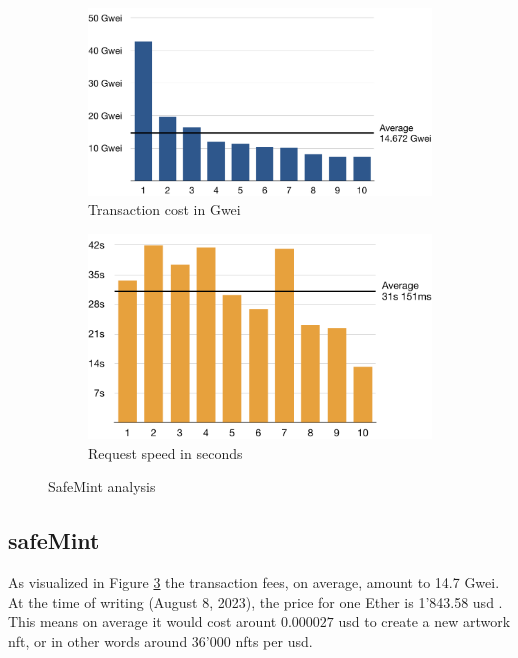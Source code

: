 \begin{figure}[h!]
    \begin{subfigure}{0.5\textwidth}
        \includegraphics[width=\textwidth]{diagrams/safeMint_tx_cost.pdf}
        \caption{Transaction cost in Gwei}
        \label{fig:safemint_tx_cost}
    \end{subfigure}
    \hfill
    \begin{subfigure}{0.5\textwidth}
        \includegraphics[width=\textwidth]{diagrams/safeMint_tx_speed.pdf}
        \caption{Request speed in seconds}
        \label{fig:safemint_tx_speed}
    \end{subfigure}
    \caption{SafeMint analysis}
    \label{fig:safemint_analysis}
\end{figure}

\subsection*{safeMint}
As visualized in Figure \ref{fig:safemint_analysis} the transaction fees, on average, amount to 14.7 Gwei. At the time of writing (August 8, 2023), the price for one Ether is 1'843.58 \gls{usd} \cite{coinmarketcap}. This means on average it would cost arount $0.000027$ \gls{usd} to create a new artwork \gls{nft}, or in other words around 36'000 \glspl{nft} per \gls{usd}.

